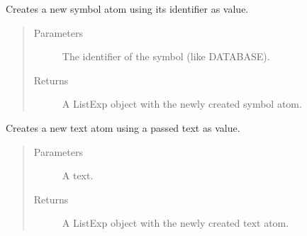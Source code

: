 \documentclass[letterpaper,10pt,english]{sphinxmanual}
\begin{document}
\begin{fulllineitems}
\label{\detokenize{index:secondodb.api.support.secondolistexpr.create_symbol_atom}}
Creates a new symbol atom using its identifier as value.
\begin{quote}\begin{description}
\item[{Parameters}] \leavevmode
{} \textendash{} The identifier of the symbol (like DATABASE).

\item[{Returns}] \leavevmode
A ListExp object with the newly created symbol atom.

\end{description}\end{quote}

\end{fulllineitems}


\begin{fulllineitems}
\label{\detokenize{index:secondodb.api.support.secondolistexpr.create_text_atom}}
Creates a new text atom using a passed text as value.
\begin{quote}\begin{description}
\item[{Parameters}] \leavevmode
{} \textendash{} A text.

\item[{Returns}] \leavevmode
A ListExp object with the newly created text atom.

\end{description}\end{quote}

\end{fulllineitems}

\end{document}
